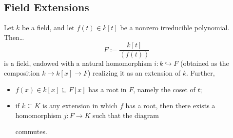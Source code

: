 \subsection{Field Extensions}\label{fieldextensions}

\begin{proposition}
Let $k$ be a field, and let $f(t) \in k[t]$ be a nonzero irreducible polynomial. Then\dots
$$F := \frac{k[t]}{(f(t))}$$
is a field, endowed with a natural homomorphism $i : k \hookrightarrow F$ (obtained as the composition $k \rightarrow k[x] \rightarrow F$)
realizing it as an extension of $k$. Further,
\begin{itemize}
  \item $f(x) \in k[x] \subseteq F[x]$ has a root in $F$, namely the coset of $t$;
  \item if $k \subseteq K$ is any extension in which $f$ has a root, then there exists a homomorphism $j : F \rightarrow K$ such that the diagram
  \begin{figure}[H]
  \centering
  
  \end{figure}
  commutes.
\end{itemize}
\end{proposition}